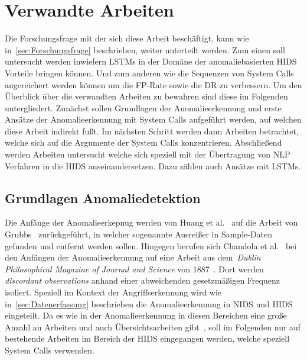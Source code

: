 \chapter{Verwandte Arbeiten}\label{ch:verwandte_arbeiten}

Die Forschungsfrage mit der sich diese Arbeit beschäftigt, kann wie in~\autoref{sec:Forschungsfrage} beschrieben, weiter unterteilt werden.
Zum einen soll untersucht werden inwiefern \acp{LSTM} in der Domäne der anomaliebasierten \ac{HIDS} Vorteile bringen können.
Und zum anderen wie die Sequenzen von System Calls angereichert werden können um die \ac{FP}-Rate sowie die \acf{DR} zu verbessern.
Um den Überblick über die verwandten Arbeiten zu bewahren sind diese im Folgenden untergliedert.
Zunächst sollen Grundlagen der Anomalieerkennung und erste Ansätze der Anomalieerkennung mit System Calls aufgeführt werden, auf welchen diese Arbeit indirekt fußt.
Im nächsten Schritt werden dann Arbeiten betrachtet, welche sich auf die Argumente der System Calls konzentrieren.
Abschließend werden Arbeiten untersucht welche sich speziell mit der Übertragung von \ac{NLP} Verfahren in die \ac{HIDS} auseinandersetzen.
Dazu zählen auch Ansätze mit \acp{LSTM}.

\section{Grundlagen Anomaliedetektion}

    Die Anfänge der Anomalieerkepnug werden von Huang et al.~\cite{ANOMALYBOOKKISHAN2017} auf die Arbeit von Grubbs~\cite{ANOMALYDEFINITION1969} zurückgeführt, in welcher sogenannte Ausreißer in Sample-Daten gefunden und entfernt werden sollen.
    Hingegen berufen sich Chandola et al.~\cite{ANOMALYSURVEY} bei den Anfängen der Anomalieerkennung auf eine Arbeit aus dem~\textit{Dublin Philosophical Magazine of Journal and Science} von 1887~\cite{ANOMALYDEFINITION1887}.
    Dort werden \textit{discordant observations} anhand einer abweichenden gesetzmäßigen Frequenz isoliert. 
    Speziell im Kontext der Angriffserkennung wird wie in~\autoref{sec:Datenerfassung} beschrieben die Anomalieerkennung in \ac{NIDS} und \ac{HIDS} eingeteilt.
    Da es wie in der Anomalieerkennung in diesen Bereichen eine große Anzahl an Arbeiten und auch Übersichtsarbeiten gibt~\cite{ANOMALYSURVEY, ANOMALYSURVEY2, ANOMALYSURVEY3}, soll im Folgenden nur auf bestehende Arbeiten im Bereich der \ac{HIDS} eingegangen werden, welche speziell System Calls verwenden.

